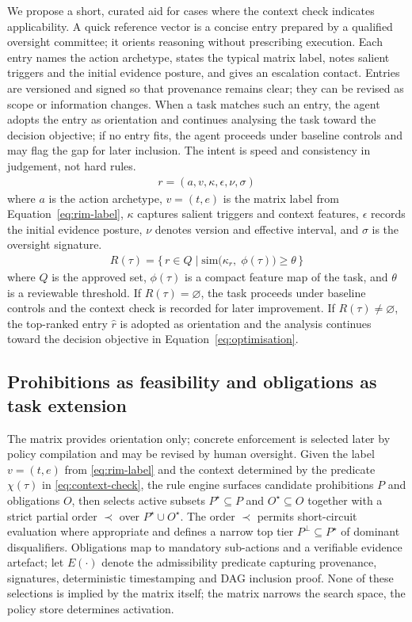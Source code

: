 \documentclass[oneside,10pt]{swissi}
\begin{document}
We propose a short, curated aid for cases where the context check indicates applicability. A quick reference vector is a concise entry prepared by a qualified oversight committee; it orients reasoning without prescribing execution. Each entry names the action archetype, states the typical matrix label, notes salient triggers and the initial evidence posture, and gives an escalation contact. Entries are versioned and signed so that provenance remains clear; they can be revised as scope or information changes. When a task matches such an entry, the agent adopts the entry as orientation and continues analysing the task toward the decision objective; if no entry fits, the agent proceeds under baseline controls and may flag the gap for later inclusion. The intent is speed and consistency in judgement, not hard rules.
\begin{align}\label{eq:qr-vector}
r = (a, v, \kappa, \epsilon, \nu, \sigma)
\end{align}
where \(a\) is the action archetype, \(v=(t,e)\) is the matrix label from Equation~\eqref{eq:rim-label}, \(\kappa\) captures salient triggers and context features, \(\epsilon\) records the initial evidence posture, \(\nu\) denotes version and effective interval, and \(\sigma\) is the oversight signature.
\begin{align}\label{eq:qr-candidates}
R(\tau) = \{\, r \in Q \mid \mathrm{sim}\big(\kappa_r,\;\phi(\tau)\big) \ge \theta \,\}
\end{align}
where \(Q\) is the approved set, \(\phi(\tau)\) is a compact feature map of the task, and \(\theta\) is a reviewable threshold. If \(R(\tau)=\varnothing\), the task proceeds under baseline controls and the context check is recorded for later improvement. If \(R(\tau)\neq\varnothing\), the top-ranked entry \(\hat r\) is adopted as orientation and the analysis continues toward the decision objective in Equation~\eqref{eq:optimisation}.

\subsection{Prohibitions as feasibility and obligations as task extension}

The matrix provides orientation only; concrete enforcement is selected later by policy compilation and may be revised by human oversight. Given the label \(v=(t,e)\) from \eqref{eq:rim-label} and the context determined by the predicate \(\chi(\tau)\) in \eqref{eq:context-check}, the rule engine surfaces candidate prohibitions \(P\) and obligations \(O\), then selects active subsets \(P^{\star}\subseteq P\) and \(O^{\star}\subseteq O\) together with a strict partial order \(\prec\) over \(P^{\star}\cup O^{\star}\). The order \(\prec\) permits short-circuit evaluation where appropriate and defines a narrow top tier \(P^{\perp}\subseteq P^{\star}\) of dominant disqualifiers. Obligations map to mandatory sub-actions and a verifiable evidence artefact; let \(E(\cdot)\) denote the admissibility predicate capturing provenance, signatures, deterministic timestamping and DAG inclusion proof. None of these selections is implied by the matrix itself; the matrix narrows the search space, the policy store determines activation.
\end{document}
